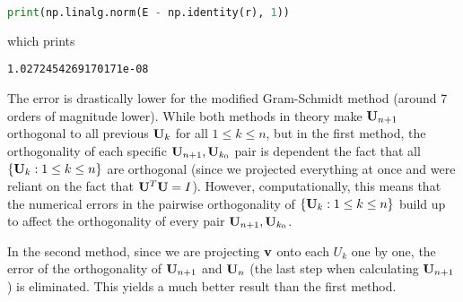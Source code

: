 \documentclass[a4paper, 12pt]{article}
\begin{document}
\begin{solution}
\begin{lstlisting}[language=python]
print(np.linalg.norm(E - np.identity(r), 1))
\end{lstlisting}
    which prints
    \begin{lstlisting}
1.0272454269170171e-08
\end{lstlisting}
    The error is drastically lower for the modified Gram-Schmidt method (around 7 orders of magnitude lower). While both methods in theory make $\mathbf{U}_{n+1}$ orthogonal to all previous $\mathbf{U}_k$ for all $1 \leq k \leq n$, but in the first method, the orthogonality of each specific $\mathbf{U}_{n+1}, \mathbf{U}_{k_0}$ pair is dependent the fact that all $\{\mathbf{U}_k: 1 \leq k \leq n\}$ are orthogonal (since we projected everything at once and were reliant on the fact that $\mathbf{U}^T\mathbf{U} = I$). However, computationally, this means that the numerical errors in the pairwise orthogonality of  $\{\mathbf{U}_k: 1 \leq k \leq n\}$ build up to affect the orthogonality of every pair $\mathbf{U}_{n+1}, \mathbf{U}_{k_0}$.

    In the second method, since we are projecting $\mathbf{v}$ onto each $U_k$ one by one, the error of the orthogonality of $\mathbf{U}_{n+1}$ and $\mathbf{U}_{n}$ (the last step when calculating $\mathbf{U}_{n+1}$) is eliminated. This yields a much better result than the first method.
\end{solution}
\end{document}
